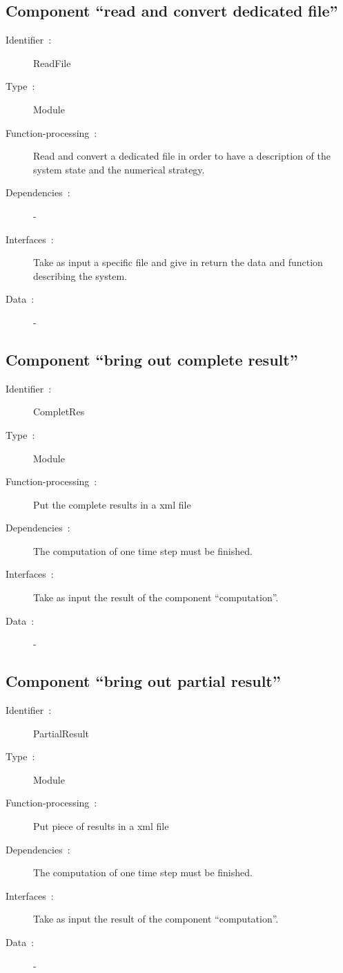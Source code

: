   	\subsection{Component ``read and convert dedicated file''}
	
		\begin{description}
	
		\item[Identifier~:]ReadFile
		\item[Type~:]Module
		\item[Function-processing~:]Read and convert a dedicated file in order to have a description of the system state and the numerical strategy.
		\item[Dependencies~:]-
		\item[Interfaces~:]Take as input a specific file and give in return the data and function describing the system.
		\item[Data~:]-

		\end{description}
	
  	\subsection{Component ``bring out complete result''}
	
		\begin{description}
	
		\item[Identifier~:]CompletRes
		\item[Type~:]Module
		\item[Function-processing~:]Put the complete results in a \ac{xml} file
		\item[Dependencies~:]The computation of one time step must be finished.
		\item[Interfaces~:]Take as input the result of the component ``computation''.
		\item[Data~:]-

		\end{description}
	
  	\subsection{Component ``bring out partial result''}
	
		\begin{description}
	
		\item[Identifier~:]PartialResult
		\item[Type~:]Module
		\item[Function-processing~:]Put piece of results in a \ac{xml} file
		\item[Dependencies~:]The computation of one time step must be finished.
		\item[Interfaces~:]Take as input the result of the component ``computation''.
		\item[Data~:]-

		\end{description}
